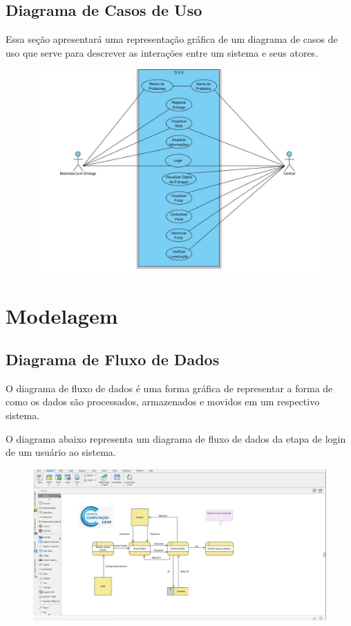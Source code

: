 \subsection{Diagrama de Casos de Uso}
Essa seção apresentará uma representação gráfica de um diagrama de casos de uso que serve para descrever as interações entre um sistema e seus atores.

\begin{figure}[H]
	\centering
	\includegraphics[width=1\linewidth]{"Pictures/Diagrama Casos de Uso"}
	\caption{}
	\label{fig:diagrama-casos-de-uso}
\end{figure}
\section{Modelagem}
    \subsection{Diagrama de Fluxo de Dados}
	O diagrama de fluxo de dados é uma forma gráfica de representar a forma de como os dados são processados, armazenados e movidos em um respectivo sistema.
	
	O diagrama abaixo representa um diagrama de fluxo de dados da etapa de login de um usuário ao sistema.
\begin{figure}[H]
	\centering
	\includegraphics[width=1\linewidth]{"Pictures/Fluxo de Dados Login"}
	\caption{}
	\label{fig:fluxo-de-dados-login}
\end{figure}

